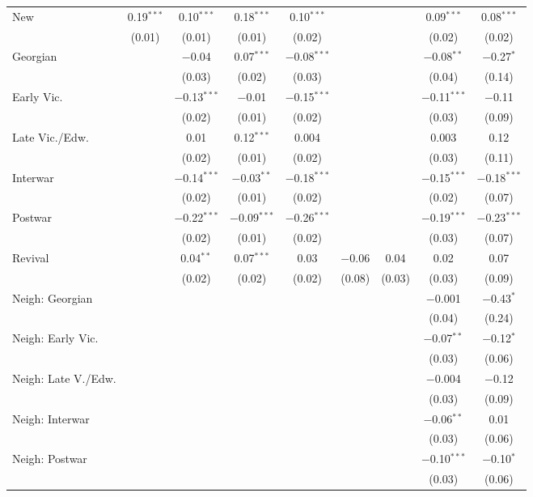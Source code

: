 \begin{table}[!htbp]
\begin{tabular}{@{\extracolsep{5pt}}lcccccccc}
  New & 0.19$^{***}$ & 0.10$^{***}$ & 0.18$^{***}$ & 0.10$^{***}$ &  &  & 0.09$^{***}$ & 0.08$^{***}$ \\ 
  & (0.01) & (0.01) & (0.01) & (0.02) &  &  & (0.02) & (0.02) \\ 
  Georgian &  & $-$0.04 & 0.07$^{***}$ & $-$0.08$^{***}$ &  &  & $-$0.08$^{**}$ & $-$0.27$^{*}$ \\ 
  &  & (0.03) & (0.02) & (0.03) &  &  & (0.04) & (0.14) \\ 
  Early Vic. &  & $-$0.13$^{***}$ & $-$0.01 & $-$0.15$^{***}$ &  &  & $-$0.11$^{***}$ & $-$0.11 \\ 
  &  & (0.02) & (0.01) & (0.02) &  &  & (0.03) & (0.09) \\ 
  Late Vic./Edw. &  & 0.01 & 0.12$^{***}$ & 0.004 &  &  & 0.003 & 0.12 \\ 
  &  & (0.02) & (0.01) & (0.02) &  &  & (0.03) & (0.11) \\ 
  Interwar &  & $-$0.14$^{***}$ & $-$0.03$^{**}$ & $-$0.18$^{***}$ &  &  & $-$0.15$^{***}$ & $-$0.18$^{***}$ \\ 
  &  & (0.02) & (0.01) & (0.02) &  &  & (0.02) & (0.07) \\ 
  Postwar &  & $-$0.22$^{***}$ & $-$0.09$^{***}$ & $-$0.26$^{***}$ &  &  & $-$0.19$^{***}$ & $-$0.23$^{***}$ \\ 
  &  & (0.02) & (0.01) & (0.02) &  &  & (0.03) & (0.07) \\ 
  Revival &  & 0.04$^{**}$ & 0.07$^{***}$ & 0.03 & $-$0.06 & 0.04 & 0.02 & 0.07 \\ 
  &  & (0.02) & (0.02) & (0.02) & (0.08) & (0.03) & (0.03) & (0.09) \\ 
  Neigh: Georgian &  &  &  &  &  &  & $-$0.001 & $-$0.43$^{*}$ \\ 
  &  &  &  &  &  &  & (0.04) & (0.24) \\ 
  Neigh: Early Vic. &  &  &  &  &  &  & $-$0.07$^{**}$ & $-$0.12$^{*}$ \\ 
  &  &  &  &  &  &  & (0.03) & (0.06) \\ 
  Neigh: Late V./Edw. &  &  &  &  &  &  & $-$0.004 & $-$0.12 \\ 
  &  &  &  &  &  &  & (0.03) & (0.09) \\ 
  Neigh: Interwar &  &  &  &  &  &  & $-$0.06$^{**}$ & 0.01 \\ 
  &  &  &  &  &  &  & (0.03) & (0.06) \\ 
  Neigh: Postwar &  &  &  &  &  &  & $-$0.10$^{***}$ & $-$0.10$^{*}$ \\ 
  &  &  &  &  &  &  & (0.03) & (0.06) \\ 

\end{tabular}
\end{table}
